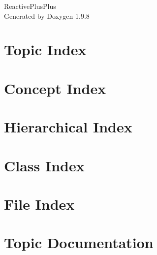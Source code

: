 \documentclass[twoside]{book}
\newcommand{\+}{\discretionary{\mbox{\scriptsize$\hookleftarrow$}}{}{}}
\newcommand{\clearemptydoublepage}{%
    \newpage{\pagestyle{empty}\cleardoublepage}%
  }
\begin{document}
  \raggedbottom
    \hypersetup{pageanchor=false,
                bookmarksnumbered=true,
                pdfencoding=unicode
               }
  \begin{titlepage}
  \vspace*{7cm}
  \begin{center}%
  {\Large Reactive\+Plus\+Plus}\\
  \vspace*{1cm}
  {\large Generated by Doxygen 1.9.8}\\
  \end{center}
  \end{titlepage}
  \clearemptydoublepage
  \tableofcontents
  \clearemptydoublepage
  \hypersetup{pageanchor=true}

\chapter{Topic Index}

\chapter{Concept Index}

\chapter{Hierarchical Index}

\chapter{Class Index}

\chapter{File Index}

\chapter{Topic Documentation}


\end{document}
